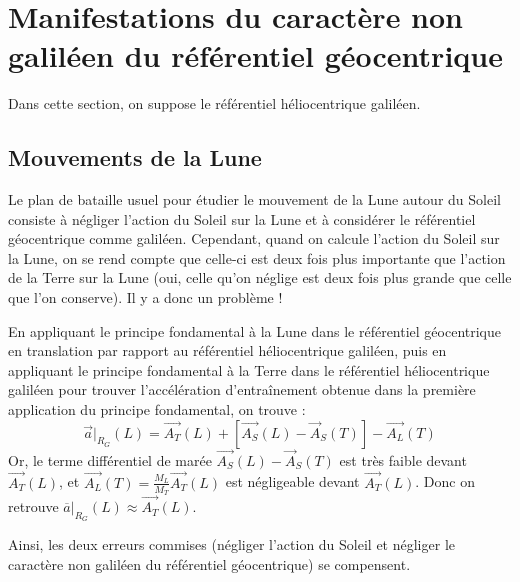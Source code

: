 \documentclass[french]{book}
\theoremstyle{plain}
\theoremstyle{definition}
\theoremstyle{remark}
\begin{document}
\section{Manifestations du caractère non galiléen du référentiel géocentrique}
Dans cette section, on suppose le référentiel héliocentrique galiléen.
\subsection{Mouvements de la Lune}
Le plan de bataille usuel pour étudier le mouvement de la Lune autour du Soleil consiste à négliger l'action du Soleil sur la Lune et à considérer le référentiel géocentrique comme galiléen. Cependant, quand on calcule l'action du Soleil sur la Lune, on se rend compte que celle-ci est deux fois plus importante que l'action de la Terre sur la Lune (oui, celle qu'on néglige est deux fois plus grande que celle que l'on conserve). Il y a donc un problème ! \\ \par 
En appliquant le principe fondamental à la Lune dans le référentiel géocentrique en translation par rapport au référentiel héliocentrique galiléen, puis en appliquant le principe fondamental à la Terre dans le référentiel héliocentrique galiléen pour trouver l'accélération d'entraînement obtenue dans la première application du principe fondamental, on trouve : $$\overrightarrow{a}\rvert_{R_G}(L)=\overrightarrow{A_T}(L)+\left[\overrightarrow{A_S}(L)-\overrightarrow{A}_{S}(T)\right]-\overrightarrow{A_L}(T)$$ Or, le terme différentiel de marée $\overrightarrow{A_S}(L)-\overrightarrow{A}_{S}(T)$ est très faible devant $\overrightarrow{A_T}(L)$, et $\displaystyle\overrightarrow{A_L}(T)=\frac{M_L}{M_T}\overrightarrow{A_T}(L)$ est négligeable devant $\overrightarrow{A_T}(L)$. Donc on retrouve $\overline{a}\rvert_{R_G}(L)\approx\overrightarrow{A_T}(L)$. \\ \par Ainsi, les deux erreurs commises (négliger l'action du Soleil et négliger le caractère non galiléen du référentiel géocentrique) se compensent.
\end{document}
